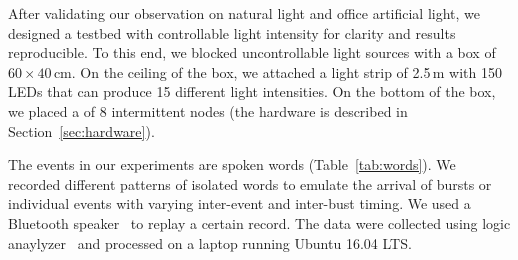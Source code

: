 %

%



After validating our observation on natural light and office artificial light, we designed a testbed with controllable light intensity for clarity and results reproducible. To this end, we blocked uncontrollable light sources with a box of $60 \times 40$\,cm. On the ceiling of the box, we attached a light strip of 2.5\,m with 150 LEDs that can produce 15 different light intensities. On the bottom of the box, we placed a \fullcim of 8 intermittent nodes (the hardware is described in Section~\ref{sec:hardware}).

The events in our experiments are spoken words (Table~\ref{tab:words}). We recorded different patterns of isolated words to emulate the arrival of bursts or individual events with varying inter-event and inter-bust timing. We used a Bluetooth speaker~\cite{jbl} to replay a certain record. The data were collected using logic anaylyzer~\cite{saleae} and processed on a laptop running Ubuntu 16.04 LTS. 


